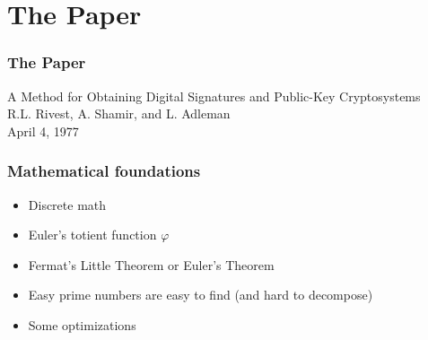 \documentclass{beamer}
\begin{document}
\section{The Paper}

\begin{frame}
	\frametitle{The Paper}
	A Method for Obtaining Digital Signatures and Public-Key Cryptosystems \\
	R.L. Rivest, A. Shamir, and L. Adleman \\
	April 4, 1977
\end{frame}

\begin{frame}
	\frametitle{Mathematical foundations}
	\begin{itemize}
		\item Discrete math
		\item Euler's totient function $\varphi$
		\item Fermat's Little Theorem or Euler's Theorem
		\item Easy prime numbers are easy to find (and hard to
		      decompose)
		\item Some optimizations
	\end{itemize}
\end{frame}
\end{document}
